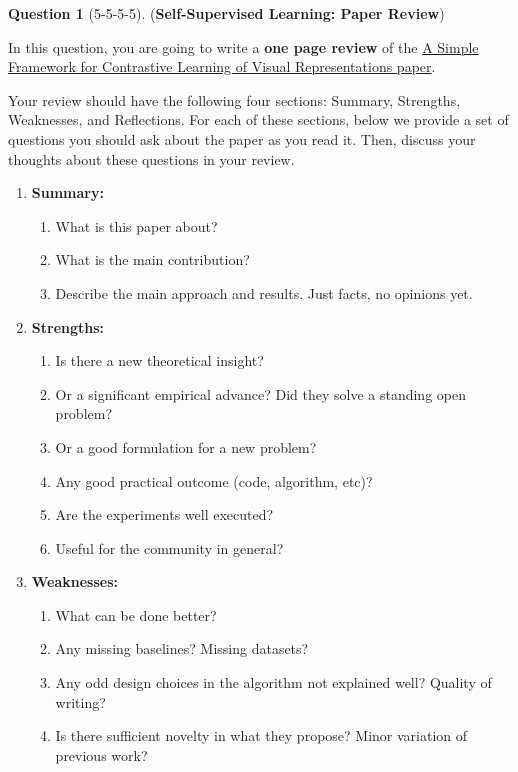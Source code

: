 \documentclass[12pt]{article}
\newif\ifsolution
\theoremstyle{definition}
\newtheorem{exercise}{Question}%
\newtheorem{answer}{Answer} %
\newcommand{\Answer}[1]{
\ifsolution
\begin{answer}#1\end{answer}
\fi
}
\begin{document}
\Answer{

  answer here
}
\begin{exercise}[5-5-5-5] (\textbf{Self-Supervised Learning: Paper Review})


In this question, you are going to write a \textbf{one page review} of the \href{https://arxiv.org/pdf/2002.05709.pdf}{A Simple Framework for Contrastive Learning of Visual Representations paper}. 

Your review should have the following four sections: Summary, Strengths, Weaknesses, and Reflections. For each of these sections, below we provide a set of questions you should ask about the paper as you read it. Then, discuss your thoughts about these questions in your review.
\begin{enumerate}[label=(\theexercise.\arabic*)]
    \item \textbf{Summary:}
    \begin{enumerate}
        \item What is this paper about?
        \item What is the main contribution? 
        \item Describe the main approach and results. Just facts, no opinions yet. 
    \end{enumerate}
    \item \textbf{Strengths:}
    \begin{enumerate}
        \item Is there a new theoretical insight?
        \item Or a significant empirical advance? Did they solve a standing open problem? 
        \item Or a good formulation for a new problem? 
        \item Any good practical outcome (code, algorithm, etc)?
        \item Are the experiments well executed? 
        \item Useful for the community in general? 
    \end{enumerate}
    \item \textbf{Weaknesses:}
    \begin{enumerate}
        \item What can be done better?
        \item Any missing baselines? Missing datasets?
        \item Any odd design choices in the algorithm not explained well? Quality of writing?
        \item Is there sufficient novelty in what they propose? Minor variation of previous work? 

\end{enumerate}
\end{enumerate}
\end{exercise}
\end{document}
